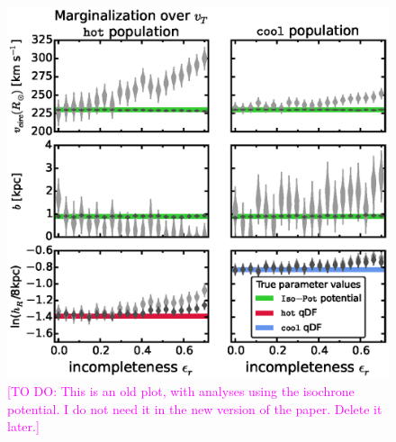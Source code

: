 \documentclass[iop,revtex4]{emulateapj}
\newcommand{\Wilma}[1]{\textcolor{Magenta}{#1}}
\newcommand{\OLD}[1]{}
\begin{document}
\begin{figure}[!htbp]
\centering
\includegraphics[width=\columnwidth]{figs/isoSphFlexIncompR_marginal_violins_3.eps}
\caption{\Wilma{[TO DO: This is an old plot, with analyses using the isochrone potential. I do not need it in the new version of the paper. Delete it later.]} \OLD{Same as Figure \ref{fig:MWdhbIncompR_violins}, but without including information about the tangential velocities in the analysis. This was done by marginalizing the likelihood in Equation \eqref{eq:prob} over $v_T$ (bright grey violins; the dark grey violins are the same as in Figure \ref{fig:MWdhbIncompR_violins} for comparison). The parameter recovery is much worse than in Figure \ref{fig:MWdhbIncompR_violins}. This could indicate that much of the information about the potential is actually stored in the rotation curve, i.e., $v_T(R)$, which is not affected by removing stars from the data set. But even if we do not include $v_T$ we can still recover the potential within the errors, at least for small ($\epsilon_r \lesssim 0.15$).}} 
\end{figure}

\end{document}
